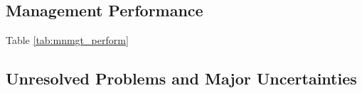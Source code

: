 \documentclass[12pt,]{article}
\begin{document}
\FloatBarrier

\hypertarget{management-performance}{%
\subsection*{Management Performance}\label{management-performance}}

Table \ref{tab:mnmgt_perform}

\begin{table}[ht]
\centering
\caption{Recent trend in total catch and commercial 
                              landings (mt) relative to the management guidelines. 
                              Estimated total catch reflect the commercial landings 
                              plus the model estimated discarded biomass.} 
\label{tab:mnmgt_perform}
\end{table}

\hypertarget{unresolved-problems-and-major-uncertainties}{%
\subsection*{Unresolved Problems and Major
Uncertainties}\label{unresolved-problems-and-major-uncertainties}}
\end{document}
